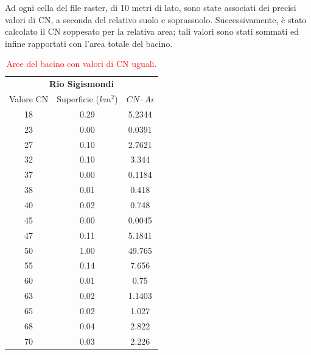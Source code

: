 Ad ogni cella del file raster, di 10 metri di lato, sono state associati dei precisi valori di CN, a seconda del relativo suolo e soprassuolo. Successivamente, è stato calcolato il CN soppesato per la relativa area; tali valori sono stati sommati ed infine rapportati con l'area totale del bacino.
\begin{table}[H] \centering
    \caption{\textcolor{red}{Aree del bacino con valori di CN uguali.}}
    \begin{tabular}{ccc}
        \toprule
    \multicolumn{3}{c}{\textbf{Rio Sigismondi}}  \\
    Valore CN & Superficie ($km^2$) & $CN \cdot Ai$   \\
    \midrule
    18                 & 0.29                           & 5.2344            \\
    23                 & 0.00                           & 0.0391            \\
    27                 & 0.10                           & 2.7621            \\
    32                 & 0.10                           & 3.344             \\
    37                 & 0.00                           & 0.1184            \\
    38                 & 0.01                           & 0.418             \\
    40                 & 0.02                           & 0.748             \\
    45                 & 0.00                           & 0.0045            \\
    47                 & 0.11                           & 5.1841            \\
    50                 & 1.00                           & 49.765            \\
    55                 & 0.14                           & 7.656             \\
    60                 & 0.01                           & 0.75              \\
    63                 & 0.02                           & 1.1403            \\
    65                 & 0.02                           & 1.027             \\
    68                 & 0.04                           & 2.822             \\
    70                 & 0.03                           & 2.226             \\

\end{tabular}
\end{table}

